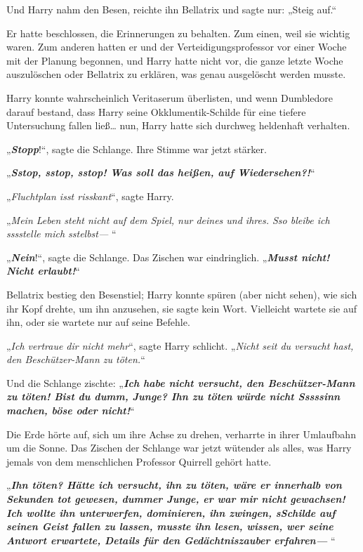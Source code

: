 {Und Harry nahm den Besen, reichte ihn Bellatrix und sagte nur: „Steig auf.“

Er hatte beschlossen, die Erinnerungen zu behalten. Zum einen, weil sie wichtig waren. Zum anderen hatten er und der Verteidigungsprofessor vor einer Woche mit der Planung begonnen, und Harry hatte nicht vor, die ganze letzte Woche auszulöschen oder Bellatrix zu erklären, was genau ausgelöscht werden musste.

Harry konnte wahrscheinlich Veritaserum überlisten, und wenn Dumbledore darauf bestand, dass Harry seine Okklumentik-Schilde für eine tiefere Untersuchung fallen ließ… nun, Harry hatte sich durchweg heldenhaft verhalten.

„\textbf{\emph{Stopp}}!“, sagte die Schlange. Ihre Stimme war jetzt stärker.

„\textbf{\emph{Sstop, sstop, sstop! Was soll das heißen, auf Wiedersehen?!}}“

„\emph{Fluchtplan isst risskant}“, sagte Harry.

„\emph{Mein Leben steht nicht auf dem Spiel, nur deines und ihres. Sso bleibe ich sssstelle mich sstelbst—} “

„\textbf{\emph{Nein}}!“, sagte die Schlange. Das Zischen war eindringlich. „\textbf{\emph{Musst nicht! Nicht erlaubt!}}“

Bellatrix bestieg den Besenstiel; Harry konnte spüren (aber nicht sehen), wie sich ihr Kopf drehte, um ihn anzusehen, sie sagte kein Wort. Vielleicht wartete sie auf ihn, oder sie wartete nur auf seine Befehle.

„\emph{Ich vertraue dir nicht mehr}“, sagte Harry schlicht. „\emph{Nicht seit du versucht hast, den Beschützer-Mann zu töten.}“

Und die Schlange zischte: „\textbf{\emph{Ich habe nicht versucht, den Beschützer-Mann zu töten! Bist du dumm, Junge? Ihn zu töten würde nicht Sssssinn machen, böse oder nicht!}}“

Die Erde hörte auf, sich um ihre Achse zu drehen, verharrte in ihrer Umlaufbahn um die Sonne. Das Zischen der Schlange war jetzt wütender als alles, was Harry jemals von dem menschlichen Professor Quirrell gehört hatte.

„\textbf{\emph{Ihn töten? Hätte ich versucht, ihn zu töten, wäre er innerhalb von Sekunden tot gewesen, dummer Junge, er war mir nicht gewachsen! Ich wollte ihn unterwerfen, dominieren, ihn zwingen, sSchilde auf seinen Geist fallen zu lassen, musste ihn lesen, wissen, wer seine Antwort erwartete, Details für den Gedächtniszauber erfahren—} }“

}
